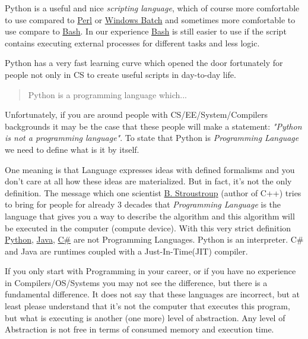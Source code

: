 \documentclass[
]{article}
\begin{document}
Python is a useful and nice \emph{scripting language}, which of course
more comfortable to use compared to
\href{https://www.perl.org/books/beginning-perl/}{Perl} or
\href{https://en.wikibooks.org/wiki/Windows_Batch_Scripting}{Windows
Batch} and sometimes more comfortable to use compare to
\href{https://www.gnu.org/savannah-checkouts/gnu/bash/manual/bash.html}{Bash}.
In our experience
\href{https://www.gnu.org/savannah-checkouts/gnu/bash/manual/bash.html}{Bash}
is still easier to use if the script contains executing external
processes for different tasks and less logic.

Python has a very fast learning curve which opened the door fortunately
for people not only in CS to create useful scripts in day-to-day life.

\begin{quote}
Python is a programming language which...
\end{quote}

Unfortunately, if you are around people with CS/EE/System/Compilers
backgrounds it may be the case that these people will make a statement:
\emph{"Python is not a programming language"}. To state that Python is
\emph{Programming Language} we need to define what is it by itself.

One meaning is that Language expresses ideas with defined formalisms and
you don't care at all how these ideas are materialized. But in fact,
it's not the only definition. The message which one scientist
\href{https://scholar.google.com/citations?user=Rr9Y8acAAAAJ\&hl=ru\&oi=ao}{B.
Stroustroup} (author of C++) tries to bring for people for already 3
decades that \emph{Programming Language} is the language that gives you
a way to describe the algorithm and this algorithm will be executed in
the computer (compute device). With this very strict definition
\href{https://www.python.org/}{Python},
\href{https://www.java.com/}{Java},
\href{https://learn.microsoft.com/en-us/dotnet/csharp/}{C\#} are not
Programming Languages. Python is an interpreter. C\# and Java are
runtimes coupled with a Just-In-Time(JIT) compiler.

If you only start with Programming in your career, or if you have no
experience in Compilers/OS/Systems you may not see the difference, but
there is a fundamental difference. It does not say that these languages
are incorrect, but at least please understand that it's not the computer
that executes this program, but what is executing is another (one more)
level of abstraction. Any level of Abstraction is not free in terms of
consumed memory and execution time.
\end{document}
